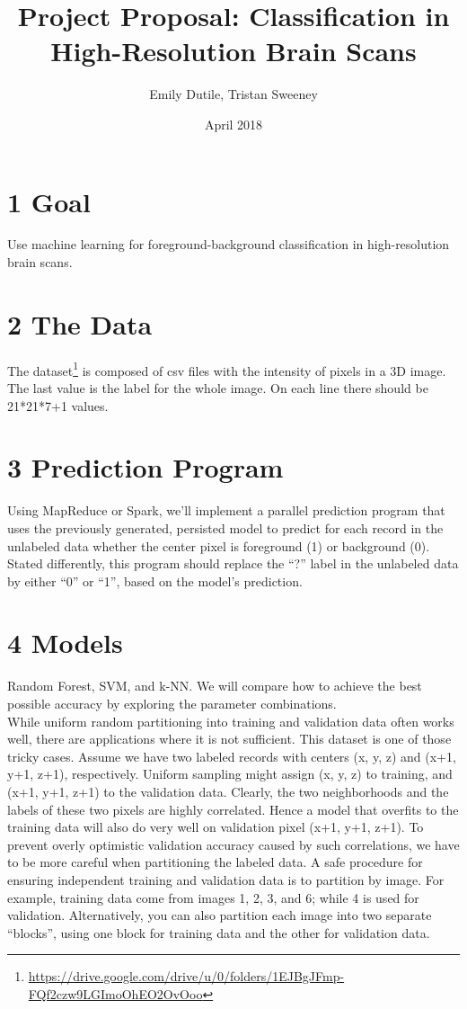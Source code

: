 \documentclass{neu_handout}
\title{Project Proposal: Classification in High-Resolution Brain Scans}
\author{Emily Dutile, Tristan Sweeney}
\date{April 2018}
\begin{document}
\section*{1 Goal}
Use machine learning for foreground-background classification in high-resolution brain scans.

\section*{2 The Data}
The dataset\footnote{\url{https://drive.google.com/drive/u/0/folders/1EJBgJFmp-FQf2czw9LGImoOhEO2OvOoo}} is composed of csv files with the intensity of pixels in a 3D image.  The last value is the label for the whole image. On each line there should be 21*21*7+1 values.

\section*{3 Prediction Program}
Using MapReduce or Spark, we'll implement a parallel prediction program that uses the previously generated, persisted model to predict for each record in the unlabeled data whether the center pixel is foreground (1) or background (0). Stated differently, this program should replace the “?” label in the unlabeled data by either “0” or “1”, based on the model’s prediction.

\section*{4 Models}
Random Forest, SVM, and k-NN. We will compare how to achieve the best possible accuracy by exploring the parameter combinations.\\

While uniform random partitioning into training and validation data often works well, there are
applications where it is not sufficient. This dataset is one of those tricky cases. Assume we have two labeled
records with centers (x, y, z) and (x+1, y+1, z+1), respectively. Uniform sampling might assign (x, y, z) to
training, and (x+1, y+1, z+1) to the validation data. Clearly, the two neighborhoods and the labels of
these two pixels are highly correlated. Hence a model that overfits to the training data will also do very
well on validation pixel (x+1, y+1, z+1). To prevent overly optimistic validation accuracy caused by such
correlations, we have to be more careful when partitioning the labeled data. A safe procedure for 
ensuring independent training and validation data is to partition by image. For example, training data
come from images 1, 2, 3, and 6; while 4 is used for validation. Alternatively, you can also partition each
image into two separate “blocks”, using one block for training data and the other for validation data.\\
\end{document}
